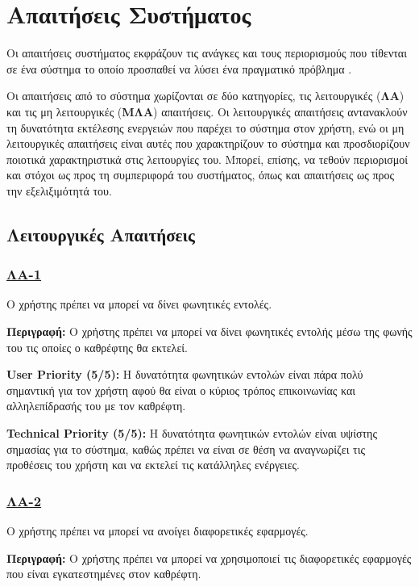\section{Απαιτήσεις Συστήματος}
\label{sec:system_requirements}


Οι απαιτήσεις συστήματος εκφράζουν τις ανάγκες και τους περιορισμούς που τίθενται σε ένα σύστημα το οποίο προσπαθεί να λύσει ένα πραγματικό πρόβλημα \cite{swebok}.

Οι απαιτήσεις από το σύστημα χωρίζονται σε δύο κατηγορίες, τις λειτουργικές (\textbf{ΛΑ}) και τις μη λειτουργικές (\textbf{ΜΛΑ}) απαιτήσεις. Οι λειτουργικές απαιτήσεις αντανακλούν τη δυνατότητα εκτέλεσης ενεργειών που παρέχει το σύστημα στον χρήστη, ενώ οι μη λειτουργικές απαιτήσεις είναι αυτές που χαρακτηρίζουν το σύστημα και προσδιορίζουν ποιοτικά χαρακτηριστικά στις λειτουργίες του. Μπορεί, επίσης, να τεθούν περιορισμοί και στόχοι ως προς τη συμπεριφορά του συστήματος, όπως και απαιτήσεις ως προς την εξελιξιμότητά του.

\subsection{Λειτουργικές Απαιτήσεις}
\subsubsection{\underline{ΛΑ-1}}
\noindent Ο χρήστης πρέπει να μπορεί να δίνει φωνητικές εντολές.

\noindent\textbf{Περιγραφή:} Ο χρήστης πρέπει να μπορεί να δίνει φωνητικές εντολής μέσω της φωνής του τις οποίες ο καθρέφτης θα εκτελεί.

\noindent\textbf{User Priority (5/5):} Η δυνατότητα φωνητικών εντολών είναι πάρα πολύ σημαντική για τον χρήστη αφού θα είναι ο κύριος τρόπος επικοινωνίας και αλληλεπίδρασής του με τον καθρέφτη.

\noindent\textbf{Technical Priority (5/5):} Η δυνατότητα φωνητικών εντολών είναι υψίστης σημασίας για το σύστημα, καθώς πρέπει να είναι σε θέση να αναγνωρίζει τις προθέσεις του χρήστη και να εκτελεί τις κατάλληλες ενέργειες.

\subsubsection{\underline{ΛΑ-2}}
\noindent Ο χρήστης πρέπει να μπορεί να ανοίγει διαφορετικές εφαρμογές.

\noindent\textbf{Περιγραφή:} Ο χρήστης πρέπει να μπορεί να χρησιμοποιεί τις διαφορετικές εφαρμογές που είναι εγκατεστημένες στον καθρέφτη.

